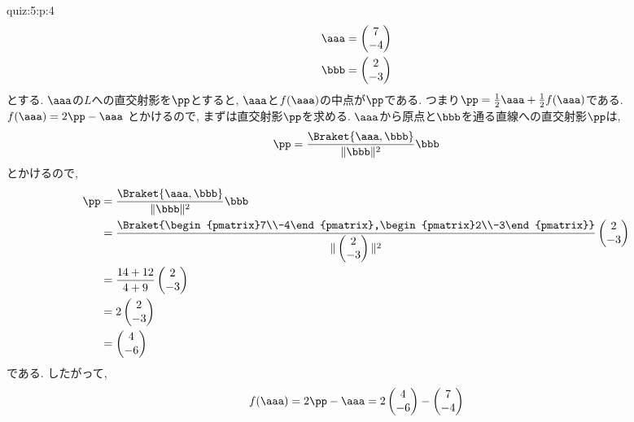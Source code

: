 \begin{answerof}{quiz:5:p:4}
  \begin{align*}
    \aaa&=\begin{pmatrix}7\\-4\end{pmatrix}\\
    \bbb&=\begin{pmatrix}2\\-3\end{pmatrix}
  \end{align*}
  とする.
  $\aaa$の$L$への直交射影を$\pp$とすると,
  $\aaa$と$f(\aaa)$の中点が$\pp$である.
  つまり$\pp=\frac{1}{2}\aaa+\frac{1}{2}f(\aaa)$である.
  $f(\aaa)=2\pp-\aaa$
  とかけるので,
  まずは直交射影$\pp$を求める.
$\aaa$から原点と$\bbb$を通る直線への直交射影$\pp$は,
\begin{align*}
\pp=\frac{\Braket{\aaa,\bbb}}{\|\bbb\|^2}\bbb
\end{align*}
とかけるので,
\begin{align*}
  \pp&=\frac{\Braket{\aaa,\bbb}}{\|\bbb\|^2}\bbb\\
  &=\frac{\Braket{\begin{pmatrix}7\\-4\end{pmatrix},\begin{pmatrix}2\\-3\end{pmatrix}}}{\|\begin{pmatrix}2\\-3\end{pmatrix}\|^2}\begin{pmatrix}2\\-3\end{pmatrix}\\
  &=\frac{14+12}{4+9}\begin{pmatrix}2\\-3\end{pmatrix}\\
  &=2\begin{pmatrix}2\\-3\end{pmatrix}\\
  &=\begin{pmatrix}4\\-6\end{pmatrix}
\end{align*}
である.
したがって,
\begin{align*}
  f(\aaa)=2\pp-\aaa
  =2\begin{pmatrix}4\\-6\end{pmatrix}-\begin{pmatrix}7\\-4\end{pmatrix}\\

\end{align*}
\end{answerof}
